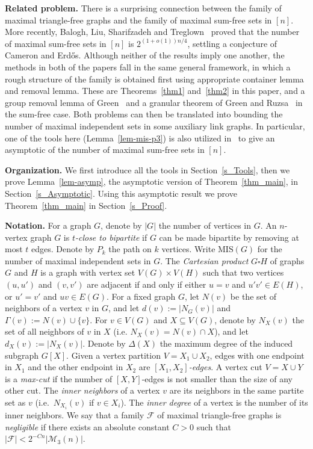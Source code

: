 \documentclass[12pt]{article}
\theoremstyle{definition}
\theoremstyle{definition}
\theoremstyle{definition}
\theoremstyle{definition}
\theoremstyle{definition}
\theoremstyle{definition}
\theoremstyle{definition}
\newcommand{\De}{\Delta}
\newcommand{\cF}{\mathcal{F}}
\newcommand{\3}{\bf{3}}
\newcommand{\MIS}{\mathrm{MIS}}
\newcommand{\cM}{\mathcal{M}}
\begin{document}
\medskip

\noindent\textbf{Related problem.} 
There is a surprising connection between the family of maximal triangle-free graphs and the family of maximal sum-free sets in $[n]$. More recently, Balogh, Liu, Sharifzadeh and Treglown~\cite{BLST} proved that the number of maximal sum-free sets in $[n]$ is $2^{(1+o(1))n/4}$, settling a conjecture of Cameron and Erd\H{o}s. Although neither of the results imply one another, the methods in both of the papers fall in the same general framework, in which a rough structure of the family is obtained first using appropriate container lemma and removal lemma. These are Theorems~\ref{thm1} and~\ref{thm2} in this paper, and a group removal lemma of Green~\cite{G} and a granular theorem of Green and Ruzsa~\cite{G-R} in the sum-free case. Both problems can then be translated into bounding the number of maximal independent sets in some auxiliary link graphs. In particular, one of the tools here (Lemma~\ref{lem-mis-p3}) is also utilized in~\cite{BLST2} to give an asymptotic of the number of maximal sum-free sets in $[n]$.

\medskip

\noindent\textbf{Organization.}
We first introduce all the tools in Section~\ref{s_Tools}, then we prove Lemma~\ref{lem-asymp}, the asymptotic version of Theorem~\ref{thm_main}, in Section~\ref{s_Asymptotic}. Using this asymptotic result we prove Theorem~\ref{thm_main} in Section~\ref{s_Proof}. 

\medskip

\noindent\textbf{Notation.} 
For a graph $G$, denote by $|G|$ the number of vertices in $G$. An $n$-vertex graph $G$ is \emph{$t$-close to bipartite} if $G$ can be made bipartite by removing at most $t$ edges.  Denote by $P_k$ the path on $k$ vertices. Write $\MIS(G)$ for the number of maximal independent sets in $G$. The \emph{Cartesian product} $G \square H$ of graphs $G$ and $H$ is a graph with vertex set $V(G)\times V(H)$ such that two vertices $(u,u')$ and $(v,v')$ are adjacent if and only if either $u=v$ and $u'v'\in E(H)$, or  $u'=v'$ and $uv\in E(G)$. For a fixed graph $G$, let
$N(v)$ be the set of neighbors of a vertex $v$ in $G$, and let $d(v):=|N_{G}(v)|$ and $\Gamma(v):=N(v)\cup\{v\}$. For $v\in V(G)$ and $X\subseteq V(G)$, denote by $N_X(v)$ the set of all neighbors of $v$ in $X$ (i.e. $N_X(v)=N(v)\cap X$), and let $d_X(v):=|N_X(v)|$. Denote by $\De(X)$ the maximum degree of the induced subgraph $G[X]$. Given a vertex partition $V=X_1\cup X_2$, edges with one endpoint in $X_1$ and the other endpoint in $X_2$ are \emph{$[X_1,X_2]$-edges}. A vertex cut $V=X\cup Y$ is a \emph{max-cut} if the number of $[X,Y]$-edges is not smaller than the size of any other cut. The \emph{inner neighbors} of a vertex $v$ are its neighbors in the same partite set as $v$ (i.e.~$N_{X_i}(v)$ if $v\in X_i$). The \emph{inner degree} of a vertex is the number of its inner neighbors. 
 We say that a family $\cF$ of maximal triangle-free graphs is \emph{negligible} if there exists an absolute constant $C>0$ such that $|\cF|<2^{-Cn}|\cM_3(n)|$.
\end{document}
